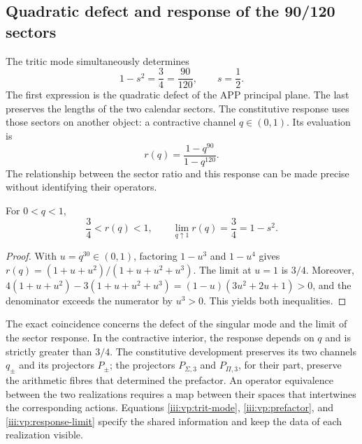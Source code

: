 \clearpage
\subsection{Quadratic defect and response of the 90/120 sectors}

The tritic mode simultaneously determines
\begin{equation}
 1-s^2=\frac34=\frac{90}{120},\qquad s=\frac12.
 \label{iii:vp:defect-ratio}
\end{equation}
The first expression is the quadratic defect of the APP principal plane.
The last preserves the lengths of the two calendar sectors.
The constitutive response uses those sectors on another object: a
contractive channel $q\in(0,1)$. Its evaluation is
\[
 r(q)=\frac{1-q^{90}}{1-q^{120}}.
\]
The relationship between the sector ratio and this response can be
made precise without identifying their operators.

\begin{proposition}
For $0<q<1$,
\begin{equation}
 \frac34<r(q)<1,\qquad
 \lim_{q\uparrow1}r(q)=\frac34=1-s^2.
 \label{iii:vp:response-limit}
\end{equation}
\end{proposition}
\begin{proof}
With $u=q^{30}\in(0,1)$, factoring $1-u^3$ and
$1-u^4$ gives
$r(q)=(1+u+u^2)/(1+u+u^2+u^3)$. The limit at $u=1$ is
$3/4$. Moreover,
$4(1+u+u^2)-3(1+u+u^2+u^3)
=(1-u)(3u^2+2u+1)>0$, and the denominator exceeds the numerator
by $u^3>0$. This yields both inequalities.
\end{proof}

The exact coincidence concerns the defect of the singular mode and the limit
of the sector response. In the contractive interior, the response
depends on $q$ and is strictly greater than $3/4$. The constitutive
development preserves its two channels $q_\pm$ and its projectors
$P_\pm$; the projectors $P_{\Sigma,3}$ and $P_{\Pi,3}$, for their
part, preserve the arithmetic fibres that determined the prefactor.
An operator equivalence between the two realizations requires a map
between their spaces that intertwines the corresponding actions.
Equations \eqref{iii:vp:trit-mode}, \eqref{iii:vp:prefactor}, and
\eqref{iii:vp:response-limit} specify the shared information and
keep the data of each realization visible.
